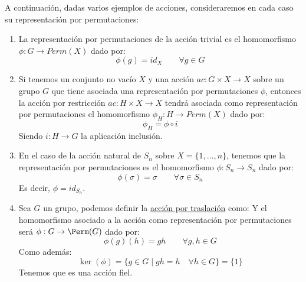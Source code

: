 \begin{ejemplo}
    A continuación, dadas varios ejemplos de acciones, consideraremos en cada caso su representación por permutaciones:
    \begin{enumerate}
        \item La representación por permutaciones de la acción trivial es el homomorfismo $\phi:G\to Perm(X)$ dado por:
            \begin{equation*}
                \phi(g) = id_X \qquad \forall g\in G
            \end{equation*}
        \item Si tenemos un conjunto no vacío $X$ y una acción $ac:G\times X\to X$ sobre un grupo $G$ que tiene asociada una representación por permutaciones $\phi$, entonces la acción por restricción $ac:H\times X\to X$ tendrá asociada como representación por permutaciones el homomorfismo $\phi_H:H\to Perm(X)$ dado por:
            \begin{equation*}
                \phi_H = \phi \circ i 
            \end{equation*}
            Siendo $i:H\to G$ la aplicación inclusión.
        \item En el caso de la acción natural de $S_n$ sobre $X =\{1,\ldots,n\} $, tenemos que la representación por permutaciones es el homomorfismo $\phi:S_n\to S_n$ dado por:
            \begin{equation*}
                \phi(\sigma) = \sigma \qquad \forall \sigma\in S_n
            \end{equation*}
            Es decir, $\phi = id_{S_n}$.
        \item Sea $G$ un grupo, podemos definir la \underline{acción por traslación} como:
            Y el homomorfismo asociado a la acción como representación por permutaciones será $\phi:G\to \Perm(G)$ dado por:
            \begin{equation*}
                \phi(g)(h) = gh \qquad \forall g,h\in G
            \end{equation*}
            Como además:
            \begin{equation*}
                \ker(\phi) = \{g\in G\mid gh = h \quad \forall h\in G\} = \{1\}
            \end{equation*}
            Tenemos que es una acción fiel.
    \end{enumerate}
\end{ejemplo}


